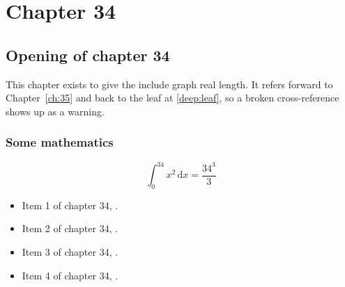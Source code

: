 \chapter{Chapter 34}
\label{ch:34}
\section{Opening of chapter 34}
This chapter exists to give the include graph real length. It refers
forward to Chapter~\ref{ch:35} and back to the leaf
at \ref{deep:leaf}, so a broken cross-reference shows up as a warning.

\subsection{Some mathematics}
\begin{equation}
  \int_0^{34} x^{2} \, \mathrm{d}x = \frac{34^{3}}{3}
\end{equation}

\begin{itemize}
  \item Item 1 of chapter 34, .
  \item Item 2 of chapter 34, .
  \item Item 3 of chapter 34, .
  \item Item 4 of chapter 34, .
\end{itemize}
